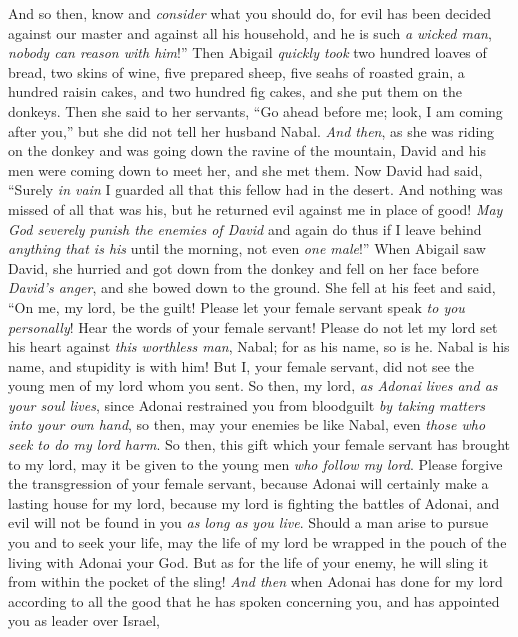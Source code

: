\begin{biblechapter}
\verse And so then, know and \textit{consider} what you should do, for evil has been decided against our master and against all his household, and he is such \textit{a wicked man}, \textit{nobody can reason with him}!”
\verse Then Abigail \textit{quickly took} two hundred loaves of bread, two skins of wine, five prepared sheep, five seahs of roasted grain, a hundred raisin cakes, and two hundred fig cakes, and she put them on the donkeys.
\verse Then she said to her servants, “Go ahead before me; look, I am coming after you,” but she did not tell her husband Nabal.
\verse \textit{And then}, as she was riding on the donkey and was going down the ravine of the mountain, David and his men were coming down to meet her, and she met them.
\verse Now David had said, “Surely \textit{in vain} I guarded all that this fellow had in the desert. And nothing was missed of all that was his, but he returned evil against me in place of good!
\verse \textit{May God severely punish the enemies of David} and again do thus if I leave behind \textit{anything that is his} until the morning, not even \textit{one male}!”
\verse When Abigail saw David, she hurried and got down from the donkey and fell on her face before \textit{David’s anger}, and she bowed down to the ground.
\verse She fell at his feet and said, “On me, my lord, be the guilt! Please let your female servant speak \textit{to you personally}! Hear the words of your female servant!
\verse Please do not let my lord set his heart against \textit{this worthless man}, Nabal; for as his name, so is he. Nabal is his name, and stupidity is with him! But I, your female servant, did not see the young men of my lord whom you sent.
\verse So then, my lord, \textit{as Adonai lives and as your soul lives}, since Adonai restrained you from bloodguilt \textit{by taking matters into your own hand}, so then, may your enemies be like Nabal, even \textit{those who seek to do my lord harm}.
\verse So then, this gift which your female servant has brought to my lord, may it be given to the young men \textit{who follow my lord}.
\verse Please forgive the transgression of your female servant, because Adonai will certainly make a lasting house for my lord, because my lord is fighting the battles of Adonai, and evil will not be found in you \textit{as long as you live}.
\verse Should a man arise to pursue you and to seek your life, may the life of my lord be wrapped in the pouch of the living with Adonai your God. But as for the life of your enemy, he will sling it from within the pocket of the sling!
\verse \textit{And then} when Adonai has done for my lord according to all the good that he has spoken concerning you, and has appointed you as leader over Israel,

\end{biblechapter}

